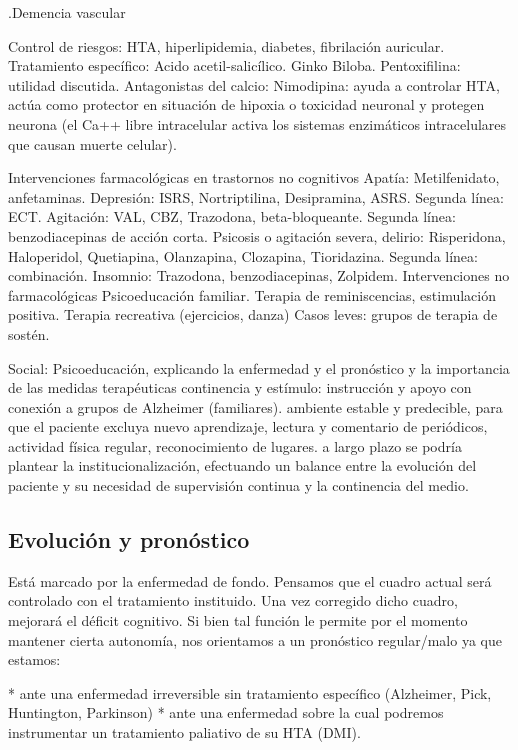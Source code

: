 .Demencia vascular

Control de riesgos: HTA, hiperlipidemia, diabetes, fibrilación auricular. Tratamiento específico: Acido acetil-salicílico. Ginko Biloba. Pentoxifilina: utilidad discutida. Antagonistas del calcio: Nimodipina: ayuda a controlar HTA, actúa como protector en situación de hipoxia o toxicidad neuronal y protegen neurona (el Ca++ libre intracelular activa los sistemas enzimáticos intracelulares que causan muerte celular).

Intervenciones farmacológicas en trastornos no cognitivos Apatía: Metilfenidato, anfetaminas. Depresión: ISRS, Nortriptilina, Desipramina, ASRS. Segunda línea: ECT. Agitación: VAL, CBZ, Trazodona, beta-bloqueante. Segunda línea: benzodiacepinas de acción corta. Psicosis o agitación severa, delirio: Risperidona, Haloperidol, Quetiapina, Olanzapina, Clozapina, Tioridazina. Segunda línea: combinación. Insomnio: Trazodona, benzodiacepinas, Zolpidem. Intervenciones no farmacológicas Psicoeducación familiar. Terapia de reminiscencias, estimulación positiva. Terapia recreativa (ejercicios, danza) Casos leves: grupos de terapia de sostén.

Social: Psicoeducación, explicando la enfermedad y el pronóstico y la importancia de las medidas terapéuticas continencia y estímulo: instrucción y apoyo con conexión a grupos de Alzheimer (familiares). ambiente estable y predecible, para que el paciente excluya nuevo aprendizaje, lectura y comentario de periódicos, actividad física regular, reconocimiento de lugares. a largo plazo se podría plantear la institucionalización, efectuando un balance entre la evolución del paciente y su necesidad de supervisión continua y la continencia del medio.

\subsection*{Evolución y pronóstico}

Está marcado por la enfermedad de fondo. Pensamos que el cuadro actual será controlado con el tratamiento instituido. Una vez corregido dicho cuadro, mejorará el déficit cognitivo. Si bien tal función le permite por el momento mantener cierta autonomía, nos orientamos a un pronóstico regular/malo ya que estamos:

* ante una enfermedad irreversible sin tratamiento específico (Alzheimer, Pick, Huntington, Parkinson)
* ante una enfermedad sobre la cual podremos instrumentar un tratamiento paliativo de su HTA (DMI).

